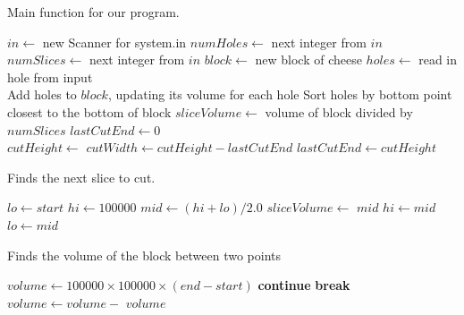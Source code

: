 \documentclass[12pt]{article}
\begin{document}
\begin{algorithm}[H]
\caption{Main function for our program.}
\begin{algorithmic}
    \State $in \gets$ new Scanner for system.in
        \State $numHoles \gets$ next integer from $in$
        \State $numSlices \gets$ next integer from $in$
        \State $block \gets$ new block of cheese
        \State $holes \gets$ read in hole from input
        \\
        \State Add holes to $block$, updating its volume for each hole
        \State Sort holes by bottom point closest to the bottom of block
        \State $sliceVolume \gets$ volume of block divided by $numSlices$
        \State $lastCutEnd \gets 0$
        \\
            \State $cutHeight \gets$ 
            \State $cutWidth \gets cutHeight - lastCutEnd$
            \State {}
            \State $lastCutEnd \gets cutHeight$
        \EndFor
        \\
        \State {}
    \EndWhile
    \EndProcedure
\end{algorithmic}
\end{algorithm}

\begin{algorithm}[H]
\caption{Finds the next slice to cut.}
\begin{algorithmic}
        \State $lo \gets start$
        \State $hi \gets 100000$
            \State $mid \gets (hi + lo) / 2.0$
            \State $sliceVolume \gets$ 
                \State \Return $mid$
                \State $hi \gets mid$
            \Else
                \State $lo \gets mid$
            \EndIf
        \EndWhile
    \EndProcedure
\end{algorithmic}
\end{algorithm}

\newpage

\begin{algorithm}[H]
\caption{Finds the volume of the block between two points}
\begin{algorithmic}
        \State $volume \gets 100000 \times 100000 \times (end - start)$
             {\bf continue} \EndIf
             {\bf break} \EndIf
            \State $volume \gets volume - $ 
        \EndFor
        \State \Return $volume$
    \EndProcedure
\end{algorithmic}
\end{algorithm}
\end{document}
